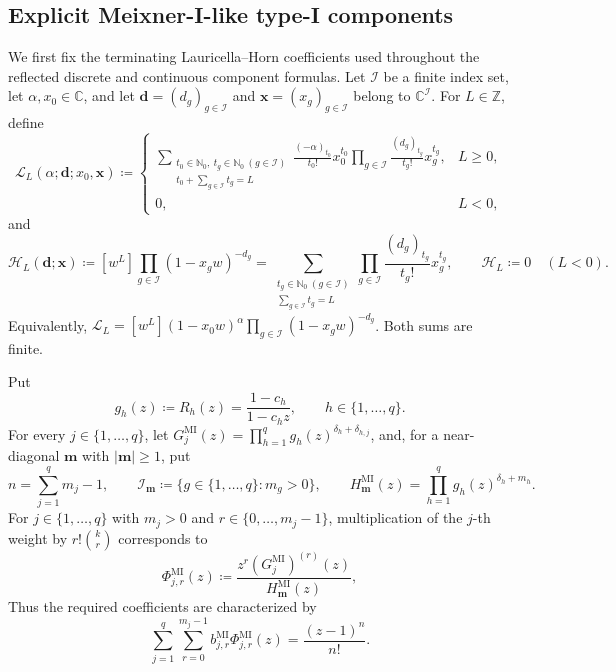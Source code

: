 \documentclass[10pt]{amsart}
\newcommand{\Nzero}{\mathbb N_0}
\newcommand{\abs}[1]{\lvert#1\rvert}
\theoremstyle{plain}
\theoremstyle{definition}
\theoremstyle{remark}
\begin{document}
\subsection{Explicit Meixner-I-like type-I components}
We first fix the terminating Lauricella--Horn coefficients used throughout
the reflected discrete and continuous component formulas. Let
\(\mathcal I\) be a finite index set, let
\(\alpha,x_0\in\mathbb C\), and let
\(\boldsymbol d=(d_g)_{g\in\mathcal I}\) and
\(\boldsymbol x=(x_g)_{g\in\mathcal I}\) belong to
\(\mathbb C^{\mathcal I}\). For \(L\in\mathbb Z\), define
\begin{equation}
 \mathscr L_L(\alpha;\boldsymbol d;x_0,\boldsymbol x)
 \coloneq
 \begin{cases}
 \displaystyle
 \sum_{\substack{t_0\in\Nzero,\ t_g\in\Nzero\ (g\in\mathcal I)\\
                  t_0+\sum_{g\in\mathcal I}t_g=L}}
 \frac{(-\alpha)_{t_0}}{t_0!}x_0^{t_0}
 \prod_{g\in\mathcal I}\frac{(d_g)_{t_g}}{t_g!}x_g^{t_g},
 &L\ge0,\\[3mm]
 0,&L<0,
 \end{cases}
 \label{eq:typeI-reflected-L}
\end{equation}
and
\begin{equation}
 \mathscr H_L(\boldsymbol d;\boldsymbol x)
 \coloneq[w^L]\prod_{g\in\mathcal I}(1-x_gw)^{-d_g}
 =\sum_{\substack{t_g\in\Nzero\ (g\in\mathcal I)\\
                   \sum_{g\in\mathcal I}t_g=L}}
 \prod_{g\in\mathcal I}\frac{(d_g)_{t_g}}{t_g!}x_g^{t_g},
 \qquad \mathscr H_L\coloneq0\quad(L<0).
 \label{eq:typeI-reflected-H}
\end{equation}
Equivalently,
\(\mathscr L_L=[w^L](1-x_0w)^\alpha
\prod_{g\in\mathcal I}(1-x_gw)^{-d_g}\). Both sums are finite.

Put
\[
 g_h(z)\coloneq R_h(z)=\frac{1-c_h}{1-c_hz},
 \qquad h\in\{1,\ldots,q\}.
\]
For every \(j\in\{1,\ldots,q\}\), let
\(G_j^{\mathrm{MI}}(z)=\prod_{h=1}^q
g_h(z)^{\delta_h+\delta_{h,j}}\),
and, for a near-diagonal \(\boldsymbol m\) with
\(\abs{\boldsymbol m}\ge1\), put
\[
 n=\sum_{j=1}^q m_j-1,\qquad
 \mathcal I_{\boldsymbol m}\coloneq\{g\in\{1,\ldots,q\}:m_g>0\},\qquad
 H_{\boldsymbol m}^{\mathrm{MI}}(z)
 =\prod_{h=1}^qg_h(z)^{\delta_h+m_h}.
\]
For \(j\in\{1,\ldots,q\}\) with \(m_j>0\) and
\(r\in\{0,\ldots,m_j-1\}\), multiplication of the \(j\)-th weight by
\(r!\binom{k}{r}\) corresponds to
\[
 \Phi_{j,r}^{\mathrm{MI}}(z)
 \coloneq\frac{z^r(G_j^{\mathrm{MI}})^{(r)}(z)}
 {H_{\boldsymbol m}^{\mathrm{MI}}(z)},
\]
Thus the required coefficients are characterized by
\begin{equation}
 \sum_{j=1}^q\sum_{r=0}^{m_j-1}
 b_{j,r}^{\mathrm{MI}}\Phi_{j,r}^{\mathrm{MI}}(z)
 =\frac{(z-1)^n}{n!}.
 \label{eq:typeI-MI-component-identity}
\end{equation}
\end{document}
